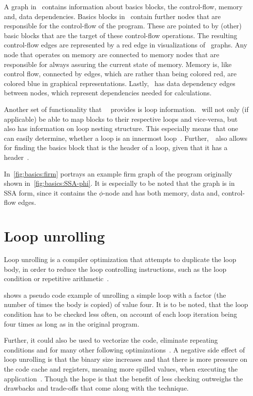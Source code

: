 A graph in \libFIRM~contains information about basics blocks, the control-flow, memory and, data dependencies.
Basics blocks in \libFIRM~contain further nodes that are responsible for the control-flow of the program.
These are pointed to by (other) basic blocks that are the target of these control-flow operations.
The resulting control-flow edges are represented by a red edge in visualizations of \libFIRM~graphs.
Any node that operates on memory are connected to memory nodes that are responsible for always assuring the current state of memory.
Memory is, like control flow, connected by edges, which are rather than being colored red, are colored blue in graphical representations.
Lastly, \libFIRM~has data dependency edges between nodes, which represent dependencies needed for calculations.

Another set of functionality that~\libFIRM~ provides is loop information.
\libFIRM~will not only (if applicable) be able to map blocks to their respective loops and vice-versa, but also has information on loop nesting structure.
This especially means that one can easily determine, whether a loop is an innermost loop~\cite{libfirm}.
Further,~\libFIRM~also allows for finding the basics block that is the header of a loop, given that it has a header~\cite{aebi18bachelorarbeit}.

In~\cref{fig:basics:firm} portrays an example firm graph of the program originally shown in~\cref{fig:basics:SSA-phi}.
It is especially to be noted that the graph is in SSA form, since it contains the $\phi$-node and has both memory, data and, control-flow edges.


\section{Loop unrolling}\label{sec:basics:unrolling}

Loop unrolling is a compiler optimization that attempts to duplicate the loop body, in order to reduce the loop controlling instructions, such as the loop condition or repetitive arithmetic~\cite{aho_ullman_1979}.

 shows a pseudo code example of unrolling a simple loop with a factor (the number of times the body is copied) of value four.
It is to be noted, that the loop condition has to be checked less often, on account of each loop iteration being four times as long as in the original program.

Further, it could also be used to vectorize the code, eliminate repeating conditions and for many other following optimizations~\cite{fog_2018}.
A negative side effect of loop unrolling is that the binary size increases and that there is more pressure on the code cache and registers, meaning more spilled values, when executing the application~\cite{Sarkar2001}.
Though the hope is that the benefit of less checking outweighs the drawbacks and trade-offs that come along with the technique.

